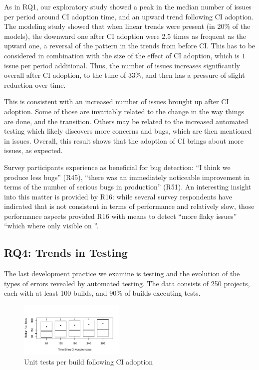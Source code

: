 As in RQ1, our exploratory study showed a peak in the median number of issues per period around CI adoption time, and an upward trend following CI adoption.
The modeling study showed that when linear trends were present (in 20\% 
of the models), the downward one after CI adoption were 2.5 times as frequent 
as the upward one, a reversal of the pattern in the trends from before CI.
This has to be considered in combination with the size of the effect of CI adoption, which is $1$ issue per period additional.
Thus, the number of issues increases significantly overall after CI adoption, to the tune of $33\%$, and then has a pressure of slight reduction over time.

This is consistent with an increased number of issues brought up after CI adoption. Some of those are invariably related to the change in the way things are done, and the transition. Others may be related to the increased automated testing which likely discovers more concerns and bugs, which are then mentioned in issues.
Overall, this result shows that the adoption of CI brings about more issues, as expected.

Survey participants experience \Tvi as beneficial for bug detection: ``I think we produce less bugs'' (R45), ``there was an immediately noticeable improvement in terms of the number of serious bugs in production'' (R51). 
An interesting insight into this matter is provided by R16: while several survey respondents have indicated that \Tvis is not consistent in terms of performance and relatively slow, those performance aspects provided R16 with means to detect ``more flaky issues'' ``which where only visible on \Tvi''. 

\subsection{RQ4: Trends in Testing}

The last development practice we examine is testing and the evolution 
of the types of errors revealed by automated testing.
The data consists of 250 projects, each with at least 100 builds, and 90\% 
of builds executing tests.

\begin{figure}[!t]
\centering
\includegraphics[width=0.45\textwidth, clip=true, trim=0 15 15 50]{tests.pdf}
\caption{Unit tests per build following CI adoption}
\label{Fig:Tests}
\end{figure}

